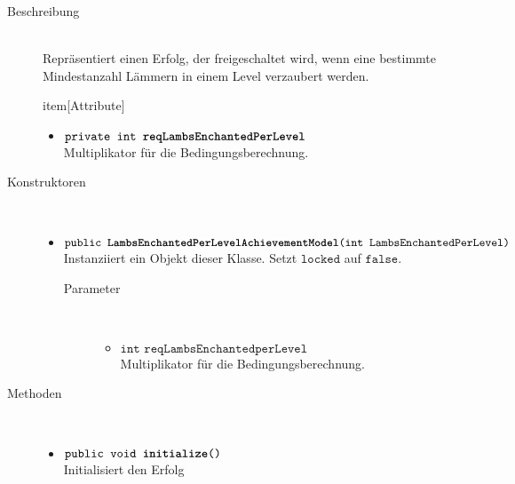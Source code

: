\begin{description}
\item[Beschreibung] \hfill \\ Repräsentiert einen Erfolg, der freigeschaltet wird, wenn eine bestimmte Mindestanzahl Lämmern in einem Level verzaubert werden.
	
item[Attribute] \hfill \\
	\vspace{-.8cm}
	\begin{itemize}
		\item $\texttt{private int \textbf{reqLambsEnchantedPerLevel}}$ \\ Multiplikator für die Bedingungsberechnung.
	\end{itemize}	
	
\item[Konstruktoren] \hfill \\
	\vspace{-.8cm}
	\begin{itemize}
		\item $\texttt{public \textbf{LambsEnchantedPerLevelAchievementModel}(int LambsEnchantedPerLevel)}$ \\ Instanziiert ein Objekt dieser Klasse. Setzt $\texttt{locked}$ auf $\texttt{false}$.
		\begin{description}
			\item[Parameter] \hfill \\
			\vspace{-.8cm}
			\begin{itemize}
				\item $\texttt{int reqLambsEnchantedperLevel}$ \\ Multiplikator für die Bedingungsberechnung.
			\end{itemize}
		\end{description}
	\end{itemize}
	
\item[Methoden] \hfill \\
	\vspace{-.8cm}
	\begin{itemize}
				\item $\texttt{public void \textbf{initialize}()}$ \\ Initialisiert den Erfolg
		

\end{itemize}
\end{description}
